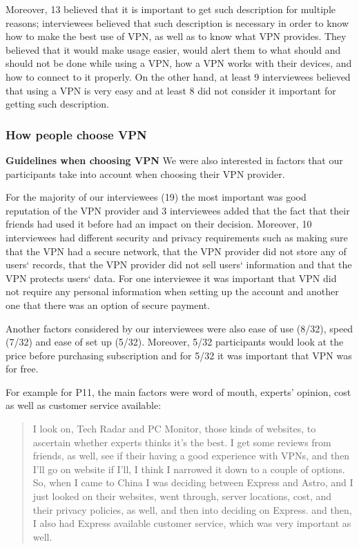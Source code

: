 Moreover, 13 believed that it is important to get such description for
multiple reasons; interviewees believed that such description is necessary in
order to know how to make the best use of VPN, as well as to know what VPN
provides. They believed that it would make usage easier, would alert them to what should and should not be done while using a VPN, how a
VPN works with their devices, and how to connect to it properly. On the
other hand, at least 9 interviewees believed that using a VPN is very easy and
at least 8 did not consider it important for getting such description. 

\subsubsection{How people choose VPN} \label{sec:findings-choosing}
\textbf{Guidelines when choosing VPN} We were also interested in factors that
our participants take into account when choosing their VPN provider.

For the majority of our interviewees (19) the most
important was good reputation of the VPN provider and 3 interviewees added
that the fact that their friends had used it before had an impact on their
decision.  Moreover, 10 interviewees had different
security and privacy requirements such as making sure that the VPN had a secure network,
that the VPN provider did not store any of users‘ records, that the VPN provider did
not sell users‘ information and that the VPN protects users‘ data. For one
interviewee it was important that VPN did not require any personal information
when setting up the account and another one that there was an option of secure
payment. 

 Another factors considered by our interviewees were also
ease of use (8/32), speed (7/32) and ease of set up (5/32). Moreover, 5/32 participants
would look at the price before purchasing subscription and for 5/32 it was
important that VPN was for free.   

For example for P11, the main factors were word of mouth, experts’ opinion,
cost as well as customer service available: \begin{quote} I look
    on, Tech Radar and PC Monitor, those kinds of websites, to ascertain
    whether experts thinks it's the best. I get some reviews from friends, as
    well, see if their having a good experience with VPNs, and then I'll go on
    website if I'll, I think I narrowed it down to a couple of
    options. So, when I came to China I was deciding between Express and
    Astro, and I just looked on their websites, went through, server
    locations, cost, and their privacy policies, as well, and then into
    deciding on Express. and then, I also had Express available
customer service, which was very important as well.\end{quote}

